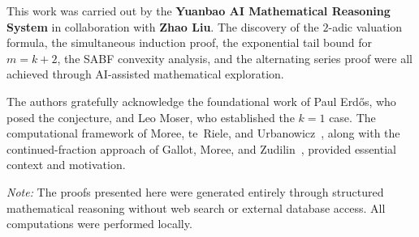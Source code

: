 \documentclass[12pt,a4paper]{article}
\theoremstyle{plain}
\theoremstyle{definition}
\begin{document}
This work was carried out by the \textbf{Yuanbao AI Mathematical Reasoning
System} in collaboration with \textbf{Zhao Liu}.  The discovery of the
$2$-adic valuation formula, the simultaneous induction proof, the
exponential tail bound for $m=k+2$, the SABF convexity analysis, and the
alternating series proof were all achieved through AI-assisted mathematical
exploration.

The authors gratefully acknowledge the foundational work of Paul Erd\H{o}s,
who posed the conjecture, and Leo Moser, who established the $k=1$ case.
The computational framework of Moree, te~Riele, and Urbanowicz~\cite{Moree},
along with the continued-fraction approach of Gallot, Moree, and
Zudilin~\cite{Gallot}, provided essential context and motivation.

\vspace{8pt}
\noindent\textit{Note:} The proofs presented here were generated entirely
through structured mathematical reasoning without web search or external
database access.  All computations were performed locally.

\end{document}
